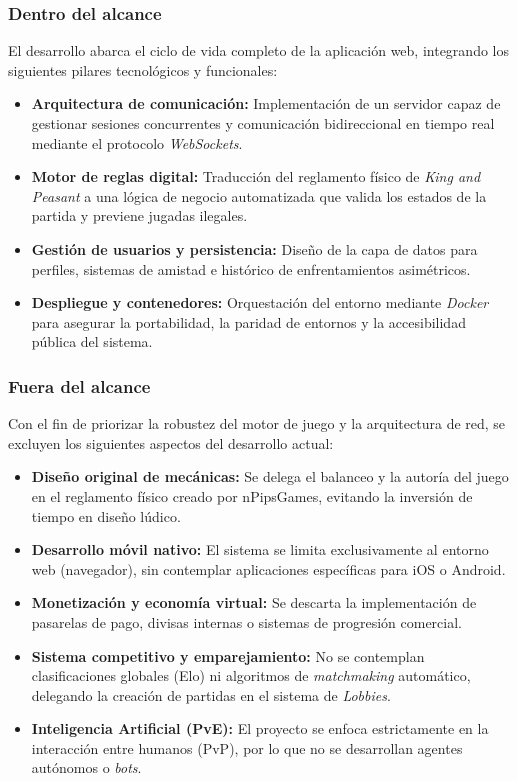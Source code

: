 \subsubsection{Dentro del alcance}
El desarrollo abarca el ciclo de vida completo de la aplicación web, integrando los siguientes pilares tecnológicos y funcionales:
\begin{itemize}
    \item \textbf{Arquitectura de comunicación:} Implementación de un servidor capaz de gestionar sesiones concurrentes y comunicación bidireccional en tiempo real mediante el protocolo \textit{WebSockets}.
    \item \textbf{Motor de reglas digital:} Traducción del reglamento físico de \textit{King and Peasant} a una lógica de negocio automatizada que valida los estados de la partida y previene jugadas ilegales.
    \item \textbf{Gestión de usuarios y persistencia:} Diseño de la capa de datos para perfiles, sistemas de amistad e histórico de enfrentamientos asimétricos.
    \item \textbf{Despliegue y contenedores:} Orquestación del entorno mediante \textit{Docker} para asegurar la portabilidad, la paridad de entornos y la accesibilidad pública del sistema.
\end{itemize}

\subsubsection{Fuera del alcance}
Con el fin de priorizar la robustez del motor de juego y la arquitectura de red, se excluyen los siguientes aspectos del desarrollo actual:
\begin{itemize}
    \item \textbf{Diseño original de mecánicas:} Se delega el balanceo y la autoría del juego en el reglamento físico creado por nPipsGames, evitando la inversión de tiempo en diseño lúdico.
    \item \textbf{Desarrollo móvil nativo:} El sistema se limita exclusivamente al entorno web (navegador), sin contemplar aplicaciones específicas para iOS o Android.
    \item \textbf{Monetización y economía virtual:} Se descarta la implementación de pasarelas de pago, divisas internas o sistemas de progresión comercial.
    \item \textbf{Sistema competitivo y emparejamiento:} No se contemplan clasificaciones globales (Elo) ni algoritmos de \textit{matchmaking} automático, delegando la creación de partidas en el sistema de \textit{Lobbies}.
    \item \textbf{Inteligencia Artificial (PvE):} El proyecto se enfoca estrictamente en la interacción entre humanos (PvP), por lo que no se desarrollan agentes autónomos o \textit{bots}.
\end{itemize}

